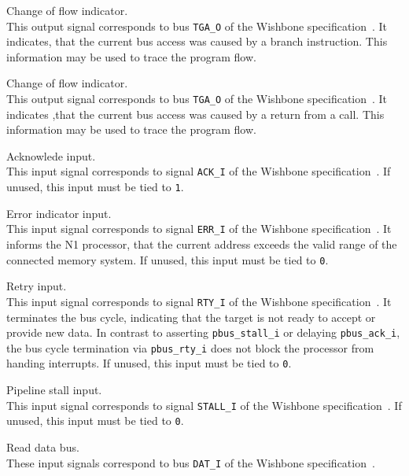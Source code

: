 \begin{description}[style=nextline]
\item[\texttt{pbus\_tga\_cof\_bra\_o}] Change of flow indicator. \\   
  This output signal corresponds to bus \texttt{TGA\_O} of the Wishbone specification~\cite{wishbone}.
  It indicates, that the current bus access was caused by a \gls{branch} instruction.
  This information may be used to trace the program flow.

\item[\texttt{pbus\_tga\_cof\_eow\_o}] Change of flow indicator. \\   
  This output signal corresponds to bus \texttt{TGA\_O} of the Wishbone specification~\cite{wishbone}.
  It indicates ,that the current bus access was caused by a return from a \gls{call}.
  This information may be used to trace the program flow.

\item[\texttt{pbus\_ack\_i}] Acknowlede input. \\   
  This input signal corresponds to signal \texttt{ACK\_I} of the Wishbone specification~\cite{wishbone}.
  If unused, this input must be tied to \texttt{1}.

\item[\texttt{pbus\_err\_i}] Error indicator input. \\  
  This input signal corresponds to signal \texttt{ERR\_I} of the Wishbone specification~\cite{wishbone}.
  It informs the N1 processor, that the current address exceeds the valid range of the connected
  memory system. 
  If unused, this input must be tied to \texttt{0}.
  
\item[\texttt{pbus\_rty\_i}] Retry input. \\  
  This input signal corresponds to signal \texttt{RTY\_I} of the Wishbone specification~\cite{wishbone}.
  It terminates the bus cycle, indicating that the target is not ready to accept or provide new data.
  In contrast to asserting \texttt{pbus\_stall\_i} or delaying \texttt{pbus\_ack\_i}, the bus cycle termination
  via \texttt{pbus\_rty\_i} does not block the processor from handing interrupts.
  If unused, this input must be tied to \texttt{0}.
  
\item[\texttt{pbus\_stall\_i}] Pipeline stall input. \\
  This input signal corresponds to signal \texttt{STALL\_I} of the Wishbone specification~\cite{wishbone}.
  If unused, this input must be tied to \texttt{0}.

\item[\texttt{pbus\_dat\_i}] Read data bus. \\ 
  These input signals correspond to bus \texttt{DAT\_I} of the Wishbone specification~\cite{wishbone}.

\end{description}

